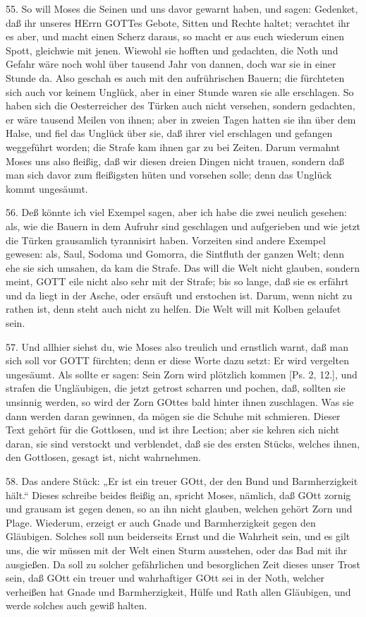 55. So will Moses die Seinen und uns davor gewarnt haben, und sagen: Gedenket, daß ihr unseres HErrn GOTTes Gebote, Sitten und Rechte haltet; verachtet ihr es aber, und macht einen Scherz daraus, so macht er aus euch wiederum einen Spott, gleichwie mit jenen. Wiewohl sie hofften und gedachten, die Noth und Gefahr wäre noch wohl über tausend Jahr von dannen, doch war sie in einer Stunde da. Also geschah es auch mit den aufrührischen Bauern; die fürchteten sich auch vor keinem Unglück, aber in einer Stunde waren sie alle erschlagen. So haben sich die Oesterreicher des Türken auch nicht versehen, sondern gedachten, er wäre tausend Meilen von ihnen; aber in zweien Tagen hatten sie ihn über dem Halse, und fiel das Unglück über sie, daß ihrer viel erschlagen und gefangen weggeführt worden; die Strafe kam ihnen gar zu bei Zeiten. Darum vermahnt Moses uns also fleißig, daß wir diesen dreien Dingen nicht trauen, sondern daß man sich davor zum fleißigsten hüten und vorsehen solle; denn das Unglück kommt ungesäumt.

56. Deß könnte ich viel Exempel sagen, aber ich habe die zwei neulich gesehen: als, wie die Bauern in dem Aufruhr sind geschlagen und aufgerieben und wie jetzt die Türken grausamlich tyrannisirt haben. Vorzeiten sind andere Exempel gewesen: als, Saul, Sodoma und Gomorra, die Sintfluth der ganzen Welt; denn ehe sie sich umsahen, da kam die Strafe. Das will die Welt nicht glauben, sondern meint, GOTT eile nicht also sehr mit der Strafe; bis so lange, daß sie es erfährt und da liegt in der Asche, oder ersäuft und erstochen ist. Darum, wenn nicht zu rathen ist, denn steht auch nicht zu helfen. Die Welt will mit Kolben gelaufet sein.

57. Und allhier siehst du, wie Moses also treulich und ernstlich warnt, daß man sich soll vor GOTT fürchten; denn er diese Worte dazu setzt: Er wird vergelten ungesäumt. Als sollte
er sagen: Sein Zorn wird plötzlich kommen [Ps. 2, 12.], und strafen die Ungläubigen, die jetzt getrost scharren und pochen, daß, sollten sie unsinnig werden, so wird der Zorn GOttes bald hinter ihnen zuschlagen. Was sie dann werden daran gewinnen, da mögen sie die Schuhe mit schmieren. Dieser Text gehört für die Gottlosen, und ist ihre Lection; aber sie kehren sich nicht daran, sie sind verstockt und verblendet, daß sie des ersten Stücks, welches ihnen, den Gottlosen, gesagt ist, nicht wahrnehmen.

58. Das andere Stück: „Er ist ein treuer GOtt, der den Bund und Barmherzigkeit hält.“ Dieses schreibe beides fleißig an, spricht Moses, nämlich, daß GOtt zornig und grausam ist gegen denen, so an ihn nicht glauben, welchen gehört Zorn und Plage. Wiederum, erzeigt er auch Gnade und Barmherzigkeit gegen den Gläubigen. Solches soll nun beiderseits Ernst und die Wahrheit sein, und es gilt uns, die wir müssen mit der Welt einen Sturm ausstehen, oder das Bad mit ihr ausgießen. Da soll zu solcher gefährlichen und besorglichen Zeit dieses unser Trost sein, daß GOtt ein treuer und wahrhaftiger GOtt sei in der Noth, welcher verheißen hat Gnade und Barmherzigkeit, Hülfe und Rath allen Gläubigen, und werde solches auch gewiß halten.

